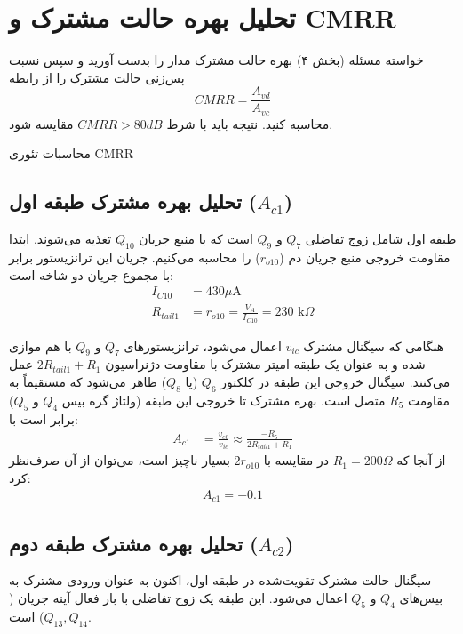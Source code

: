 \documentclass[12pt,a4paper]{article}
\begin{document}
\newpage

\section{تحلیل بهره حالت مشترک و CMRR}

\begin{taskbox}{خواسته مسئله (بخش ۴)}
بهره حالت مشترک مدار را بدست آورید و سپس نسبت پس‌زنی حالت مشترک را از رابطه
$$CMRR = \frac{A_{vd}}{A_{vc}}$$
محاسبه کنید. نتیجه باید با شرط $CMRR>80dB$ مقایسه شود.
\end{taskbox}

\begin{calcbox}{محاسبات تئوری CMRR}


\subsection*{تحلیل بهره مشترک طبقه اول ($A_{c1}$)}
طبقه اول شامل زوج تفاضلی $Q_7$ و $Q_9$ است که با منبع جریان $Q_{10}$ تغذیه می‌شوند. ابتدا مقاومت خروجی منبع جریان دم ($r_{o10}$) را محاسبه می‌کنیم. جریان این ترانزیستور برابر با مجموع جریان دو شاخه است:
\begin{align*}
	I_{C10} & = 430 \mu\text{A} \\
	R_{tail1} &= r_{o10} = \frac{V_A}{I_{C10}} = 230 \text{ k}\Omega
\end{align*}

هنگامی که سیگنال مشترک $v_{ic}$ اعمال می‌شود، ترانزیستورهای $Q_7$ و $Q_9$ با هم موازی شده و به عنوان یک طبقه امیتر مشترک با مقاومت دژنراسیون $2R_{tail1} + R_1$ عمل می‌کنند. سیگنال خروجی این طبقه در کلکتور $Q_6$ (یا $Q_8$) ظاهر می‌شود که مستقیماً به مقاومت $R_5$ متصل است. بهره مشترک تا خروجی این طبقه (ولتاژ گره بیس $Q_4$ و $Q_5$) برابر است با:
\begin{align*}
	A_{c1} &= \frac{v_{c6}}{v_{ic}} \approx \frac{-R_5}{2 R_{tail1} + R_1}
\end{align*}
از آنجا که $R_1 = 200 \Omega$ در مقایسه با $2r_{o10}$ بسیار ناچیز است، می‌توان از آن صرف‌نظر کرد:
\begin{align*}
	A_{c1} = -0.1
\end{align*}

\subsection*{تحلیل بهره مشترک طبقه دوم ($A_{c2}$)}
سیگنال حالت مشترک تقویت‌شده در طبقه اول، اکنون به عنوان ورودی مشترک به بیس‌های $Q_4$ و $Q_5$ اعمال می‌شود. این طبقه یک زوج تفاضلی با بار فعال آینه جریان ($Q_{13}, Q_{14}$) است. 


\end{calcbox}
\end{document}
